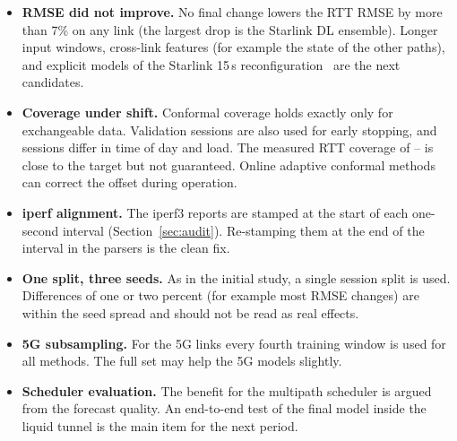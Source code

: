 \begin{itemize}[leftmargin=*]
  \item \textbf{RMSE did not improve.} No final change lowers the RTT RMSE by more than 7\% on any link (the largest drop is the Starlink DL ensemble). Longer input windows, cross-link features (for example the state of the other paths), and explicit models of the Starlink 15\,s reconfiguration~\cite{tanveer2023making} are the next candidates.
  \item \textbf{Coverage under shift.} Conformal coverage holds exactly only for exchangeable data. Validation sessions are also used for early stopping, and sessions differ in time of day and load. The measured RTT coverage of \PICPMin--\PICPMax{} is close to the target but not guaranteed. Online adaptive conformal methods~\cite{gibbs2021adaptive} can correct the offset during operation.
  \item \textbf{iperf alignment.} The iperf3 reports are stamped at the start of each one-second interval (Section~\ref{sec:audit}). Re-stamping them at the end of the interval in the parsers is the clean fix.
  \item \textbf{One split, three seeds.} As in the initial study, a single session split is used. Differences of one or two percent (for example most RMSE changes) are within the seed spread and should not be read as real effects.
  \item \textbf{5G subsampling.} For the 5G links every fourth training window is used for all methods. The full set may help the 5G models slightly.
  \item \textbf{Scheduler evaluation.} The benefit for the multipath scheduler is argued from the forecast quality. An end-to-end test of the final model inside the liquid tunnel is the main item for the next period.
\end{itemize}
